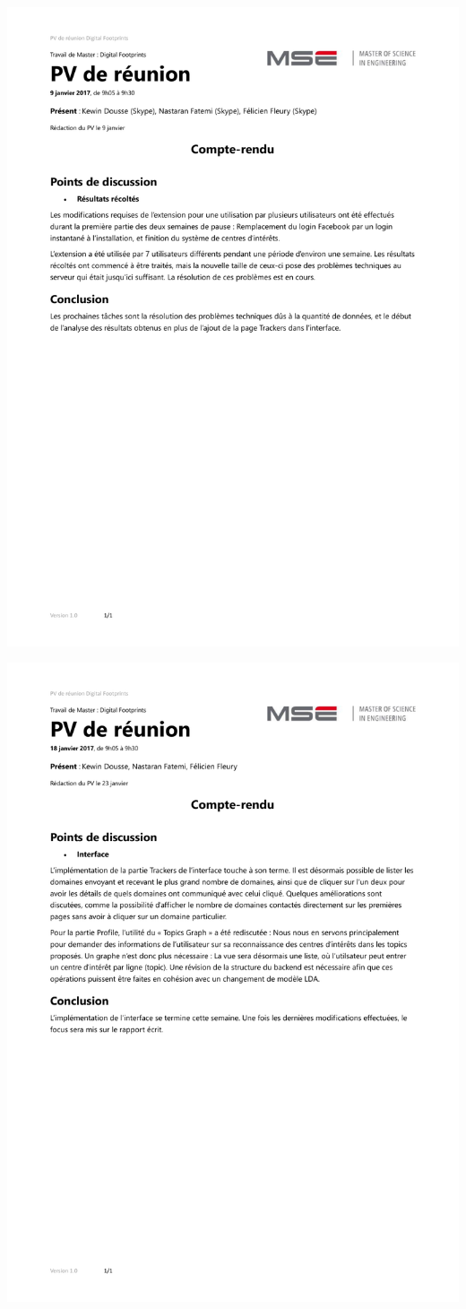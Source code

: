 \includegraphics[width=1\textwidth]{images/annexes/pvs/DigFootprints_PV_09_01_2018}

\includegraphics[width=1\textwidth]{images/annexes/pvs/DigFootprints_PV_18_01_2018}